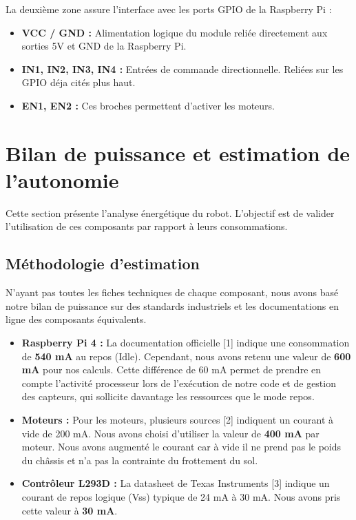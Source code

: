 La deuxième zone assure l'interface avec les ports GPIO de la Raspberry Pi :
\begin{itemize}
    \item \textbf{VCC / GND :} Alimentation logique du module reliée directement aux sorties 5V et GND de la Raspberry Pi.
    \item \textbf{IN1, IN2, IN3, IN4 :} Entrées de commande directionnelle. Reliées sur les GPIO déja cités plus haut.
    \item \textbf{EN1, EN2 :} Ces broches permettent d'activer les moteurs.
\end{itemize}

\section{Bilan de puissance et estimation de l'autonomie}

Cette section présente l'analyse énergétique du robot. L'objectif est de valider l'utilisation de ces composants par rapport à leurs consommations.

\subsection{Méthodologie d'estimation}
N'ayant pas toutes les fiches techniques de chaque composant, nous avons basé notre bilan de puissance sur des standards industriels et les documentations en ligne des composants équivalents. 

\begin{itemize}
    \item \textbf{Raspberry Pi 4 :} La documentation officielle [1] indique une consommation de \textbf{540 mA} au repos (Idle). Cependant, nous avons retenu une valeur de \textbf{600 mA} pour nos calculs. Cette différence de 60 mA permet de prendre en compte l'activité processeur lors de l'exécution de notre code et de gestion des capteurs, qui sollicite davantage les ressources que le mode repos.
    
    \item \textbf{Moteurs :} Pour les moteurs, plusieurs sources [2] indiquent un courant à vide de 200 mA. Nous avons choisi d'utiliser la valeur de \textbf{400 mA} par moteur. Nous avons augmenté le courant car à vide il ne prend pas le poids du châssis et n'a pas la contrainte du frottement du sol.
    
    \item \textbf{Contrôleur L293D :} La datasheet de Texas Instruments [3] indique un courant de repos logique (Vss) typique de 24 mA à 30 mA. Nous avons pris cette valeur à \textbf{30 mA}.
\end{itemize}

